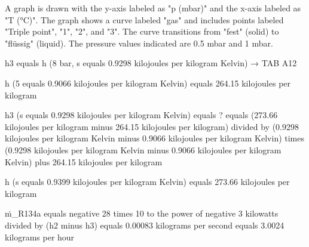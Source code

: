 A graph is drawn with the y-axis labeled as "p (mbar)" and the x-axis labeled as "T (°C)". The graph shows a curve labeled "gas" and includes points labeled "Triple point", "1", "2", and "3". The curve transitions from "fest" (solid) to "flüssig" (liquid). The pressure values indicated are 0.5 mbar and 1 mbar.

h3 equals h (8 bar, s equals 0.9298 kilojoules per kilogram Kelvin) → TAB A12  

h (5 equals 0.9066 kilojoules per kilogram Kelvin) equals 264.15 kilojoules per kilogram  

h3 (s equals 0.9298 kilojoules per kilogram Kelvin) equals ? equals (273.66 kilojoules per kilogram minus 264.15 kilojoules per kilogram) divided by (0.9298 kilojoules per kilogram Kelvin minus 0.9066 kilojoules per kilogram Kelvin) times (0.9298 kilojoules per kilogram Kelvin minus 0.9066 kilojoules per kilogram Kelvin) plus 264.15 kilojoules per kilogram  

h (s equals 0.9399 kilojoules per kilogram Kelvin) equals 273.66 kilojoules per kilogram  

ṁ_R134a equals negative 28 times 10 to the power of negative 3 kilowatts divided by (h2 minus h3) equals 0.00083 kilograms per second equals 3.0024 kilograms per hour